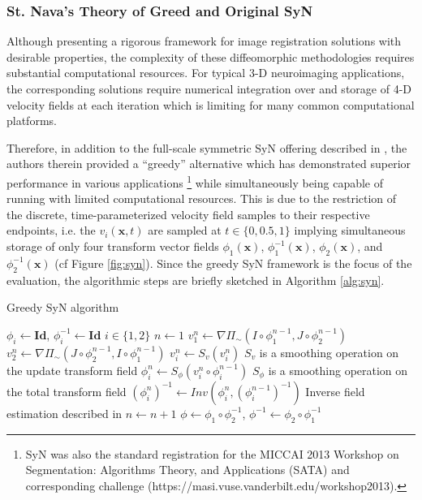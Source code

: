 \documentclass{frontiersSCNS}
\begin{document}
\subsubsection{St. Nava's Theory of Greed and Original SyN}

Although presenting a rigorous framework for image registration solutions
with desirable properties, the complexity of these diffeomorphic methodologies
requires substantial computational resources.  For typical 3-D neuroimaging
applications, the corresponding solutions require numerical integration over
and storage of 4-D velocity fields at each iteration which is limiting for
many common computational platforms.

Therefore, in addition to the full-scale
symmetric SyN offering described in \cite{avants2008}, the authors therein
provided a ``greedy'' alternative which has demonstrated superior performance
in various applications \citep{avants2011,klein2009,murphy2011}%
\footnote{
SyN was also the standard registration for the MICCAI 2013
Workshop on Segmentation:  Algorithms Theory, and Applications (SATA)
and corresponding challenge (https://masi.vuse.vanderbilt.edu/workshop2013).
}
while simultaneously being capable of running with limited computational
resources.  This is due to the restriction of the discrete, time-parameterized
velocity field samples to their respective
endpoints, i.e. the $v_i(\mathbf{x},t)$ are sampled at $t \in \{0,0.5,1\}$
implying simultaneous storage of only four transform vector fields
$\phi_1(\mathbf{x})$,
$\phi_1^{-1}(\mathbf{x})$, $\phi_2(\mathbf{x})$, and $\phi_2^{-1}(\mathbf{x})$
(cf Figure \ref{fig:syn}).  Since the greedy SyN framework is the focus of the evaluation,
the algorithmic steps are briefly sketched
in Algorithm \ref{alg:syn}.

\begin{algorithm}
\caption{Greedy SyN algorithm}
\label{alg:syn}
\begin{algorithmic}
\State $\phi_i \leftarrow \mathbf{Id}$, $\phi_i^{-1} \leftarrow \mathbf{Id}$
\Comment $i \in \{1,2\}$
\State $n \leftarrow 1$
  \State $v_1^n \leftarrow \nabla \Pi_{\sim} \left(I\circ\phi_1^{n-1},J\circ\phi_2^{n-1}\right)$
  \State $v_2^n \leftarrow \nabla \Pi_{\sim} \left(J\circ\phi_2^{n-1},I\circ\phi_1^{n-1}\right)$
  \State $v_i^n \leftarrow S_v( v_i^n )$      \Comment $S_v$ is a smoothing operation on the update transform field
  \State $\phi_i^n \leftarrow S_\phi( v_i^n \circ \phi_i^{n-1} )$      \Comment $S_\phi$ is a smoothing operation on the total transform field
  \State $\left(\phi_i^n\right)^{-1} \leftarrow Inv\left(\phi_i^n, \left(\phi_i^{n-1}\right)^{-1}\right)$
    \Comment Inverse field estimation described in \cite{avants2008}
  \State $n \leftarrow n + 1$
\EndWhile
\State \Return $\phi \leftarrow \phi_1 \circ \phi_2^{-1}$, $\phi^{-1} \leftarrow \phi_2 \circ \phi_1^{-1}$
\end{algorithmic}
\end{algorithm}
\end{document}
